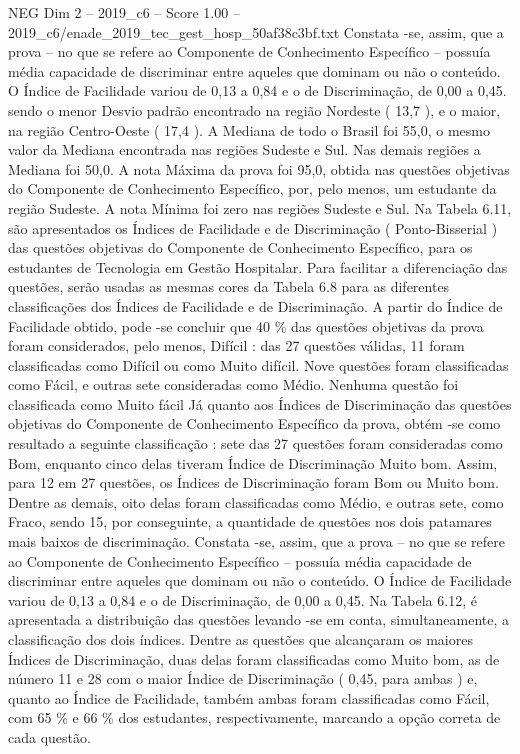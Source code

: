 \begin{textsample}{NEG Dim 2 – 2019\_c6 – Score 1.00 – 2019\_c6/enade\_2019\_tec\_gest\_hosp\_50af38c3bf.txt}
Constata -se, assim, que a prova – no que se refere ao Componente de Conhecimento Específico – possuía média capacidade de discriminar entre aqueles que dominam ou não o conteúdo.
O Índice de Facilidade variou de 0,13 a 0,84 e o de Discriminação, de 0,00 a 0,45. sendo o menor Desvio padrão encontrado na região Nordeste ( 13,7 ), e o maior, na região Centro-Oeste ( 17,4 ).
A Mediana de todo o Brasil foi 55,0, o mesmo valor da Mediana encontrada nas regiões Sudeste e Sul.
Nas demais regiões a Mediana foi 50,0.
A nota Máxima da prova foi 95,0, obtida nas questões objetivas do Componente de Conhecimento Específico, por, pelo menos, um estudante da região Sudeste.
A nota Mínima foi zero nas regiões Sudeste e Sul.
Na Tabela 6.11, são apresentados os Índices de Facilidade e de Discriminação ( Ponto-Bisserial ) das questões objetivas do Componente de Conhecimento Específico, para os estudantes de Tecnologia em Gestão Hospitalar.
Para facilitar a diferenciação das questões, serão usadas as mesmas cores da Tabela 6.8 para as diferentes classificações dos Índices de Facilidade e de Discriminação.
A partir do Índice de Facilidade obtido, pode -se concluir que 40 \% das questões objetivas da prova foram considerados, pelo menos, Difícil : das 27 questões válidas, 11 foram classificadas como Difícil ou como Muito difícil.
Nove questões foram classificadas como Fácil, e outras sete consideradas como Médio.
Nenhuma questão foi classificada como Muito fácil Já quanto aos Índices de Discriminação das questões objetivas do Componente de Conhecimento Específico da prova, obtém -se como resultado a seguinte classificação : sete das 27 questões foram consideradas como Bom, enquanto cinco delas tiveram Índice de Discriminação Muito bom.
Assim, para 12 em 27 questões, os Índices de Discriminação foram Bom ou Muito bom.
Dentre as demais, oito delas foram classificadas como Médio, e outras sete, como Fraco, sendo 15, por conseguinte, a quantidade de questões nos dois patamares mais baixos de discriminação.
Constata -se, assim, que a prova – no que se refere ao Componente de Conhecimento Específico – possuía média capacidade de discriminar entre aqueles que dominam ou não o conteúdo.
O Índice de Facilidade variou de 0,13 a 0,84 e o de Discriminação, de 0,00 a 0,45.
Na Tabela 6.12, é apresentada a distribuição das questões levando -se em conta, simultaneamente, a classificação dos dois índices.
Dentre as questões que alcançaram os maiores Índices de Discriminação, duas delas foram classificadas como Muito bom, as de número 11 e 28 com o maior Índice de Discriminação ( 0,45, para ambas ) e, quanto ao Índice de Facilidade, também ambas foram classificadas como Fácil, com 65 \% e 66 \% dos estudantes, respectivamente, marcando a opção correta de cada questão.

\end{textsample}
